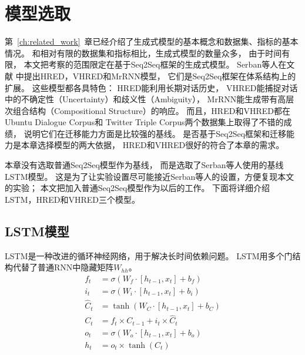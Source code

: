 \section{模型选取}\label{sec:model_selection}
第~\ref{ch:related_work}~章已经介绍了生成式模型的基本概念和数据集、指标的基本情况。
和相对有限的数据集和指标相比，生成式模型的数量众多，
由于时间有限，
本文把考察的范围限定在基于Seq2Seq框架的生成式模型。
Serban等人在文献\cite{HRED,VHRED,MrRNN}
中提出HRED，VHRED和MrRNN模型，
它们是Seq2Seq框架在体系结构上的扩展。
这些模型都各具特色：
HRED能利用长期对话历史，
VHRED能捕捉对话中的不确定性（Uncertainty）和歧义性（Ambiguity），
MrRNN能生成带有高层次组合结构（Compositional Structure）的响应。
而且，HRED和VHRED都在Ubuntu Dialogue Corpus和
Twitter Triple Corpus两个数据集上取得了不错的成绩，
说明它们在迁移能力方面是比较强的基线。
是否基于Seq2Seq框架和迁移能力是本章选择模型的两大依据，
HRED和VHRED很好的符合了本章的需求。

本章没有选取普通Seq2Seq模型作为基线，
而是选取了Serban等人使用的基线LSTM模型。
这是为了让实验设置尽可能接近Serban等人的设置，方便复现本文的实验；
本文把加入普通Seq2Seq模型作为以后的工作。
下面将详细介绍LSTM，HRED和VHRED三个模型。

\subsection{LSTM模型}\label{subsec:LSTM}
LSTM是一种改进的循环神经网络，用于解决长时间依赖问题。
LSTM用多个门结构代替了普通RNN中隐藏矩阵$W_{hh}$。
\begin{align}
    f_t &= \sigma(W_f \cdot [h_{t-1}, x_t] + b_f) \\
    i_t &= \sigma(W_i \cdot [h_{t-1}, x_t] + b_i) \\
    \hat{C}_t &= \tanh(W_C \cdot [h_{t-1}, x_t] + b_C) \\
    C_t &= f_t \times C_{t-1} + i_t \times \hat{C}_t \\
    o_t &= \sigma(W_o \cdot [h_{t-1}, x_t] + b_o) \\
    h_t &= o_t \times \tanh(C_t)
    \label{eqn:LSTM_formula}
\end{align}

